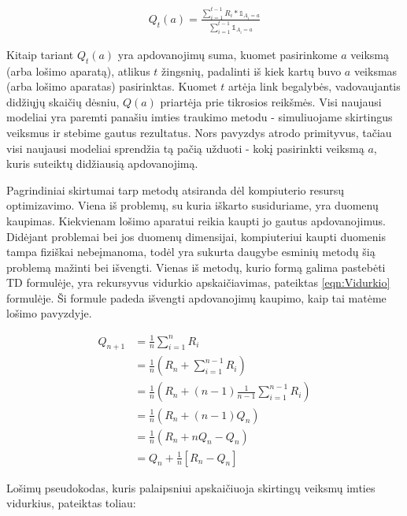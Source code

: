 \documentclass[a4paper, 12pt]{article}
\begin{document}
\begin{equation}
\label{eqn:Q(a)}
\begin{gathered}
Q_t(a) = \frac{\sum_{i=1}^{t-1}R_i*\mathbb{1}_{A_i=a}} {\sum_{i=1}^{t-1}\mathbb{1}_{A_i=a}}
\end{gathered}
\end{equation}

Kitaip tariant $Q_t(a)$ yra apdovanojimų suma, kuomet pasirinkome $a$ veiksmą (arba lošimo aparatą), atlikus $t$ žingsnių, padalinti iš kiek kartų buvo $a$ veiksmas (arba lošimo aparatas) pasirinktas. Kuomet $t$ artėja link begalybės, vadovaujantis didžiųjų skaičių dėsniu, $Q(a)$ priartėja prie tikrosios reikšmės. Visi naujausi modeliai yra paremti panašiu imties traukimo metodu - simuliuojame skirtingus veiksmus ir stebime gautus rezultatus. Nors pavyzdys atrodo primityvus, tačiau visi naujausi modeliai sprendžia tą pačią užduoti - kokį pasirinkti veiksmą $a$, kuris suteiktų didžiausią apdovanojimą. 

Pagrindiniai skirtumai tarp metodų atsiranda dėl kompiuterio resursų optimizavimo. Viena iš problemų, su kuria iškarto susiduriame, yra duomenų kaupimas. Kiekvienam lošimo aparatui reikia kaupti jo gautus apdovanojimus. Didėjant problemai bei jos duomenų dimensijai, kompiuteriui kaupti duomenis tampa fiziškai nebeįmanoma, todėl yra sukurta daugybe esminių metodų šią problemą mažinti bei išvengti. Vienas iš metodų, kurio formą galima pastebėti TD formulėje, yra rekursyvus vidurkio apskaičiavimas, pateiktas \ref{eqn:Vidurkio} formulėje. Ši formule padeda išvengti apdovanojimų kaupimo, kaip tai matėme lošimo pavyzdyje.

\begin{equation}
\label{eqn:Vidurkio}
\begin{aligned}
Q_{n+1} &=\frac{1}{n} \sum_{i=1}^{n} R_{i} \\
&=\frac{1}{n}\left(R_{n}+\sum_{i=1}^{n-1} R_{i}\right) \\
&=\frac{1}{n}\left(R_{n}+(n-1) \frac{1}{n-1} \sum_{i=1}^{n-1} R_{i}\right) \\
&=\frac{1}{n}\left(R_{n}+(n-1) Q_{n}\right) \\
&=\frac{1}{n}\left(R_{n}+n Q_{n}-Q_{n}\right) \\
&=Q_{n}+\frac{1}{n}\left[R_{n}-Q_{n}\right]
\end{aligned}
\end{equation}

Lošimų pseudokodas, kuris palaipsniui apskaičiuoja skirtingų veiksmų imties vidurkius, pateiktas toliau:
\end{document}
